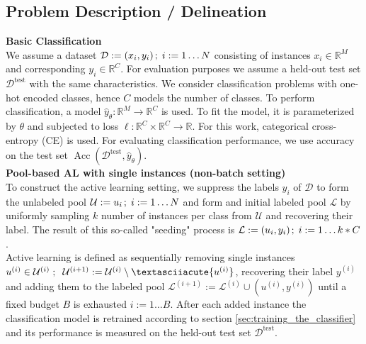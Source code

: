 \documentclass[]{article}
\begin{document}
\subsection{Problem Description / Delineation}
\textbf{Basic Classification}\\
We assume a dataset $\mathcal{D} := (x_i, y_i) \hspace{0.5mm}; \hspace{1mm} i := 1 \ldots N$ consisting of instances $x_i \in \mathbb{R}^M$ and corresponding $y_i \in \mathbb{R}^C$.
For evaluation purposes we assume a held-out test set $\mathcal{D}^{\text{test}}$ with the same characteristics.
We consider classification problems with one-hot encoded classes, hence $C$ models the number of classes.
To perform classification, a model $\hat y_\theta : \mathbb{R}^M \rightarrow \mathbb{R}^C$ is used. To fit the model, it is parameterized by $\theta$ and subjected to loss $\ell: \mathbb{R}^C \times \mathbb{R}^C \rightarrow \mathbb{R}$. For this work, categorical cross-entropy (CE) is used.
For evaluating classification performance, we use accuracy on the test set $\operatorname{Acc}(\mathcal{D}^{\text{test}}, \hat{y}_\theta)$. \\ [1mm]
%
\textbf{Pool-based AL with single instances (non-batch setting)}\\
To construct the active learning setting, we suppress the labels $y_i$ of $\mathcal{D}$ to form the unlabeled pool $\mathcal{U} := u_i \hspace{0.5mm}; \hspace{1mm} i := 1 \ldots N$ and form and initial labeled pool $\mathcal{L}$ by uniformly sampling $k$ number of instances per class from $\mathcal{U}$ and recovering their label. 
The result of this so-called "seeding" process is $\mathcal{L} := (u_i, y_i) \hspace{0.5mm}; \hspace{1mm} i := 1 \ldots k*C$. \\
Active learning is defined as sequentially removing single instances $u^{(i)} \in \mathcal{U}^{(i)}\hspace{1mm}; \hspace{2mm} \mathcal{U}^{(i+1)} := \mathcal{U}^{(i)} \setminus´ \{u^{(i)}\}$, recovering their label $y^{(i)}$ and adding them to the labeled pool $\mathcal{L}^{(i+1)} := \mathcal{L}^{(i)} \cup (u^{(i)}, y^{(i)})$ until a fixed budget $B$ is exhausted $i := 1 \ldots B$.
After each added instance the classification model is retrained according to section \ref{sec:training_the_classifier} and its performance is measured on the held-out test set $\mathcal{D}^{\text{test}}$.
\end{document}
